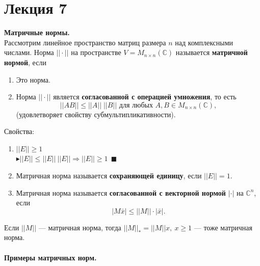 \documentclass[12pt]{article}
\theoremstyle{definition}
\numberwithin{equation}{section}
\begin{document}
\section *{Лекция 7}
\noindent \textbf{Матричные нормы.}\\
Рассмотрим линейное пространство матриц размера $n$ над комплексными числами. Норма $||\cdot||$ на пространстве $V=M_{n\times n}(\mathbb{C})$ называется \textbf{матричной нормой}, если \begin{enumerate}[start=0]
\item Это норма.
\item Норма $||\cdot ||$ является \textbf{согласованной с операцией умножения}, то есть $$||AB|| \leq ||A|| \; ||B|| \text{ для любых } A, B \in M_{n\times n}(\mathbb{C}),$$ (удовлетворяет свойству субмультипликативности).\end{enumerate}
Свойства:\begin{enumerate}
    \item  $||E||\geqslant1$\\
    $\blacktriangleright ||E||\leqslant||E||~||E|| \Rightarrow ||E||\geqslant1~~\blacksquare$
    \item Матричная норма называется \textbf{сохраняющей единицу}, если $||E||=1.$
    \item Матричная норма называется \textbf{согласованной с векторной нормой} $|\cdot|$ на $\mathbb{C}^n$, если $$|M\bar x|\leqslant||M||\cdot |\bar x|.$$
\end{enumerate}
Если $||M||$ --- матричная норма, тогда $||M||_*=||M||x,~x\geqslant1$ --- тоже матричная норма.\\
\\
\textbf{Примеры матричных норм.}
\end{document}
